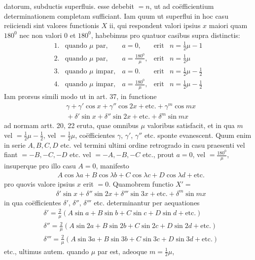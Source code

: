 datorum, subductis superfluis. esse debebit $=n$, ut ad coëfficientium
determinationem completam sufficiant. Iam quum ut superflui in hoc casu
reiiciendi sint valores functionis $X$ ii, qui respondent valori ipsius $x$
maiori quam $180^0$ nec non valori $0$ et $180^0$, habebimus pro quatuor
casibus supra distinctis:
\[
\begin{array}{rllcl}
1.&\text{quando }\mu\text{ par},&a=0,&\text{erit}&n=\frac12\mu-1\\
2.&\text{quando }\mu\text{ par},&a=\frac{180^0}{\mu},&\text{erit}&n=\frac12\mu\\
3.&\text{quando }\mu\text{ impar},&a=0.&\text{erit}&n=\frac12\mu-\frac12\\
4.&\text{quando }\mu\text{ impar},&a=\frac{180^0}{\mu},&\text{erit}&n=\frac12\mu-\frac12
\end{array}
\]
Iam prorsus simili modo ut in art. 37, in functione
\[
\begin{aligned}
&\gamma+\gamma'\cos x+\gamma''\cos 2x+\text{etc.}+\gamma^m\cos mx\\[6pt]
&{}+\delta'\sin x+\delta''\sin 2x+\text{etc.}+\delta^m\sin mx
\end{aligned}
\]
ad normam artt. 20, 22 eruta, quae omnibus $\mu$ valoribus satisfacit,
et in qua $m$ vel $=\frac12\mu-\frac12$, vel $=\frac12\mu$,
coëfficientes $\gamma$, $\gamma'$, $\gamma''$ etc. sponte evanescent.
Quum enim in serie $A,B,C,D$ etc. vel termini ultimi ordine retrogrado
in casu praesenti vel fiant $=-B,-C,-D$ etc. vel $=-A,-B,-C$ etc.,
prout $a=0$, vel $=\frac{180^0}{\mu}$, insuperque pro illo casu $A=0$,
manifesto
\[
\begin{aligned}
&A\cos\lambda a+B\cos\lambda b+C\cos\lambda c+D\cos\lambda d+\text{etc.}
\end{aligned}
\]
pro quovis valore ipsius $x$ erit $=0$. Quamobrem functio $X'=$
\[
\begin{aligned}
&\delta'\sin x+\delta''\sin 2x+\delta'''\sin 3x+\text{etc.}+\delta^m\sin mx
\end{aligned}
\]
in qua coëfficientes $\delta'$, $\delta''$, $\delta'''$ etc. determinantur
per aequationes
\[
\begin{aligned}
&\delta'=\frac2\mu(A\sin a+B\sin b+C\sin c+D\sin d+\text{etc.})\\[6pt]
&\delta''=\frac2\mu(A\sin 2a+B\sin 2b+C\sin 2c+D\sin 2d+\text{etc.})\\[6pt]
&\delta'''=\frac2\mu(A\sin 3a+B\sin 3b+C\sin 3c+D\sin 3d+\text{etc.})
\end{aligned}
\]
etc., ultimus autem. quando $\mu$ par est, adeoque $m=\frac12\mu$,
